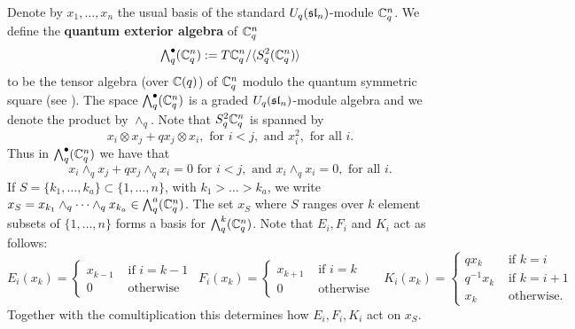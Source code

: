 \documentclass[11pt]{amsart}
\begin{document}
Denote by $ x_1, \dots, x_n $ the usual basis of the standard $U_q(\sl_n)$-module $\bC_q^n $. We define the {\bf quantum exterior algebra} of $ \bC_q^n $
$$  \Alt{\bullet}{q}(\bC_q^n) := T \bC_q^n / \langle S^2_q ( \bC_q^n) \rangle $$
to be the tensor algebra (over $\bC(q) $) of $ \bC_q^n $ modulo the quantum symmetric square (see \cite{BZ}). The space $ \Alt{\bullet}{q}(\bC_q^n) $ is a graded $U_q(\sl_n)$-module algebra and we denote the product by $ \wedge_q $. Note that $S^2_q \bC_q^n $ is spanned by 
$$ x_i \otimes x_j + q x_j \otimes x_i, \text{ for }  i < j , \text{ and } x_i^2, \text{ for all } i. $$ 
Thus in $ \Alt{\bullet}{q}(\bC_q^n) $ we have that
$$ x_i \wedge_q x_j + q x_j \wedge_q x_i = 0 \text{ for }  i < j, \text{ and } x_i \wedge_q x_i = 0, \text{ for all }  i. $$
If $ S =\{k_1, \dots, k_a\} \subset \{1, \dots, n\} $, with $ k_1 > \dots > k_a $, we write $ x_S = x_{k_1} \wedge_q \cdots \wedge_q x_{k_a} \in \Alt{a}{q}(\bC_q^n) $. The set $ x_S $ where $ S $ ranges over $ k $ element subsets of $ \{1, \dots, n \} $ forms a basis for $ \Alt{k}{q}(\bC_q^n) $. Note that $E_i, F_i$ and $K_i$ act as follows:
$$E_i(x_k) = \begin{cases} x_{k-1} & \text{ if } i=k-1 \\ 0 & \text{ otherwise } \end{cases} \ \
F_i(x_k) = \begin{cases} x_{k+1} & \text{ if } i=k \\ 0 & \text{ otherwise } \end{cases} \ \ 
K_i(x_k) = \begin{cases} qx_k & \text{ if } k = i \\ q^{-1} x_k & \text{ if } k=i+1 \\ x_k & \text{ otherwise. } \end{cases}$$
Together with the comultiplication this determines how $E_i,F_i,K_i$ act on $x_S$. 
\end{document}
